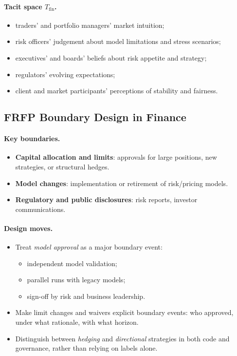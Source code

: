 \paragraph{Tacit space \(T_{\mathrm{fin}}\).}

\begin{itemize}
  \item traders’ and portfolio managers’ market intuition;
  \item risk officers’ judgement about model limitations and stress
        scenarios;
  \item executives’ and boards’ beliefs about risk appetite and
        strategy;
  \item regulators’ evolving expectations;
  \item client and market participants’ perceptions of stability and
        fairness.
\end{itemize}

\subsection{FRFP Boundary Design in Finance}

\paragraph{Key boundaries.}

\begin{itemize}
  \item \textbf{Capital allocation and limits}:
        approvals for large positions, new strategies, or structural
        hedges.
  \item \textbf{Model changes}:
        implementation or retirement of risk/pricing models.
  \item \textbf{Regulatory and public disclosures}:
        risk reports, investor communications.
\end{itemize}

\paragraph{Design moves.}

\begin{itemize}
  \item Treat \emph{model approval} as a major boundary event:
        \begin{itemize}
          \item independent model validation;
          \item parallel runs with legacy models;
          \item sign-off by risk and business leadership.
        \end{itemize}
  \item Make limit changes and waivers explicit boundary events:
        who approved, under what rationale, with what horizon.
  \item Distinguish between \emph{hedging} and \emph{directional}
        strategies in both code and governance, rather than relying on
        labels alone.
\end{itemize}

